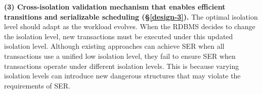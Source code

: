 \textbf{(3) Cross-isolation validation mechanism that enables efficient transitions and serializable scheduling (\S\ref{design-3}).} 
The optimal isolation level should adapt as the workload evolves. When the RDBMS decides to change the isolation level, new transactions must be executed under this updated isolation level. Although existing approaches can achieve SER when all transactions use a unified low isolation level, they fail to ensure SER when transactions operate under different isolation levels. This is because varying isolation levels can introduce new dangerous structures that may violate the requirements of SER.

